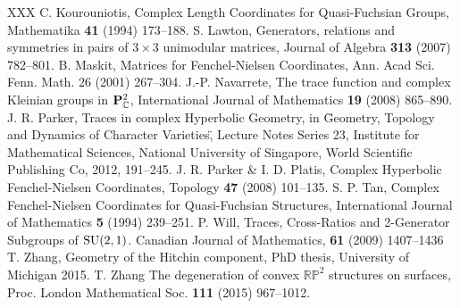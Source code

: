 \documentclass[11pt]{amsart}
\numberwithin{equation}{section}
\begin{document}
\begin{thebibliography}{XXX}
	C. Kourouniotis, Complex Length Coordinates for Quasi-Fuchsian Groups, Mathematika {\bf 41} (1994) 173--188.
S. Lawton, Generators, relations and symmetries in pairs of $3\times3$ unimodular matrices, Journal of Algebra {\bf 313} (2007) 782--801.
	 B. Maskit, Matrices for Fenchel-Nielsen Coordinates, Ann. Acad Sci. Fenn. Math. 26 (2001) 267--304.
	J.-P. Navarrete, The trace function and complex Kleinian groups in ${\bf P}^2_{\mathbb C}$, International Journal of Mathematics {\bf 19} (2008) 865--890.
	J. R. Parker, Traces in complex Hyperbolic Geometry, in \"Geometry, Topology and Dynamics of Character Varieties\", Lecture Notes Series 23, Institute for Mathematical Sciences, National University of Singapore, World Scientific Publishing Co, 2012, 191--245.
	J. R. Parker \& I. D. Platis, Complex Hyperbolic Fenchel-Nielsen Coordinates, Topology {\bf 47} (2008) 101--135.
	S. P. Tan, Complex Fenchel-Nielsen Coordinates for Quasi-Fuchsian Structures, International Journal of Mathematics {\bf 5} (1994) 239--251.
	 P. Will, Traces, Cross-Ratios and 2-Generator Subgroups of ${\rm SU}(2,1)$. Canadian Journal of Mathematics, {\bf 61} (2009) 1407--1436
	 T. Zhang, Geometry of the Hitchin component, PhD thesis, University of Michigan 2015.
	 T. Zhang The degeneration of convex ${\mathbb R}{\mathbb P}^2$ structures on surfaces, Proc. London Mathematical Soc. {\bf 111} (2015) 967--1012.
\end{thebibliography}
\end{document}
